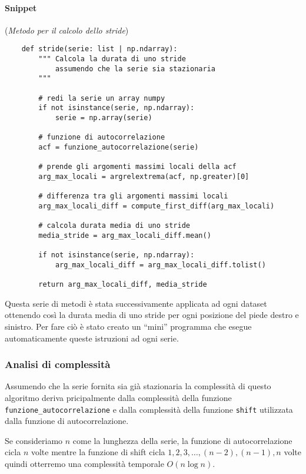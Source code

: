\paragraph{Snippet} (\textit{Metodo per il calcolo dello stride})
\begin{verbatim}
    def stride(serie: list | np.ndarray):
        """ Calcola la durata di uno stride
            assumendo che la serie sia stazionaria    
        """

        # redi la serie un array numpy
        if not isinstance(serie, np.ndarray):
            serie = np.array(serie)
        
        # funzione di autocorrelazione
        acf = funzione_autocorrelazione(serie)

        # prende gli argomenti massimi locali della acf
        arg_max_locali = argrelextrema(acf, np.greater)[0]

        # differenza tra gli argomenti massimi locali
        arg_max_locali_diff = compute_first_diff(arg_max_locali)

        # calcola durata media di uno stride
        media_stride = arg_max_locali_diff.mean()

        if not isinstance(serie, np.ndarray):
            arg_max_locali_diff = arg_max_locali_diff.tolist()

        return arg_max_locali_diff, media_stride

\end{verbatim}


Questa serie di metodi è stata successivamente applicata ad ogni dataset ottenendo così la durata
media di uno stride per ogni posizione del piede destro e sinistro. Per fare ciò è stato creato
un ``mini'' programma che esegue automaticamente queste istruzioni ad ogni serie.

\subsubsection{Analisi di complessità}
\begin{sloppypar}
Assumendo che la serie fornita sia già stazionaria la complessità di questo algoritmo 
deriva pricipalmente dalla complessità della funzione  \texttt{funzione\_autocorrelazione} e dalla complessità
della funzione \texttt{shift} utilizzata dalla funzione di autocorrelazione.
\end{sloppypar}

Se consideriamo $n$ come la lunghezza della serie, la funzione di autocorrelazione cicla $n$ volte
mentre la funzione di shift cicla $1,2,3,\dots,(n-2),(n-1),n$ volte quindi otterremo
una complessità temporale $O(n\log{n})$.

